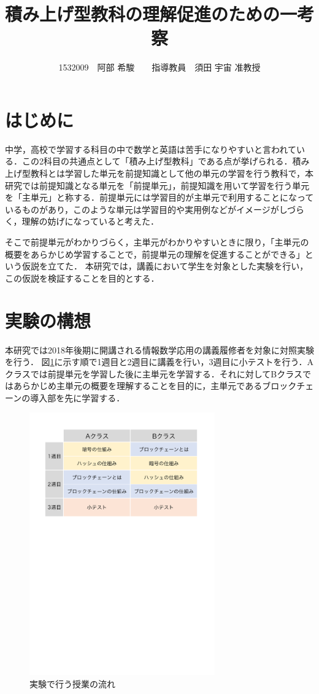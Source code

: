 \documentclass[twocolumn,10pt,a4j]{jsarticle}
\title{積み上げ型教科の理解促進のための一考察}
\author{1532009　阿部 希駿　　指導教員　須田 宇宙 准教授}
\date{}
\begin{document}
\maketitle

\section{はじめに}

中学，高校で学習する科目の中で数学と英語は苦手になりやすいと言われている\cite{1}．この2科目の共通点として「積み上げ型教科」である点が挙げられる．積み上げ型教科とは学習した単元を前提知識として他の単元の学習を行う教科で，本研究では前提知識となる単元を「前提単元」，前提知識を用いて学習を行う単元を「主単元」と称する．前提単元には学習目的が主単元で利用することになっているものがあり，このような単元は学習目的や実用例などがイメージがしづらく，理解の妨げになっていると考えた．

そこで前提単元がわかりづらく，主単元がわかりやすいときに限り，「主単元の概要をあらかじめ学習することで，前提単元の理解を促進することができる」という仮説を立てた．
本研究では，講義において学生を対象とした実験を行い，この仮説を検証することを目的とする．



\section{実験の構想}

本研究では2018年後期に開講される情報数学応用の講義履修者を対象に対照実験を行う．
図\ref{fig:time}に示す順で1週目と2週目に講義を行い，3週目に小テストを行う．Aクラスでは前提単元を学習した後に主単元を学習する．それに対してBクラスではあらかじめ主単元の概要を理解することを目的に，主単元であるブロックチェーンの導入部を先に学習する．

\begin{figure}[H]
\centering
\includegraphics[mediaboxonly=/CropBox,width=8cm]{timeline.pdf}
\caption{実験で行う授業の流れ}
\label{fig:time}
\end{figure}
\end{document}
